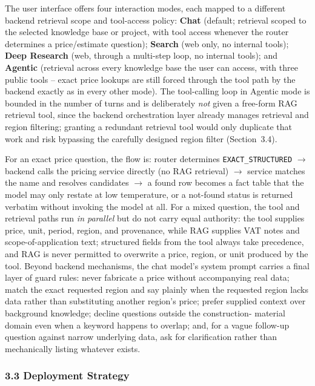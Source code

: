 \documentclass[11pt,a4paper]{article}
\begin{document}
The user interface offers four interaction modes, each mapped to a different
backend retrieval scope and tool-access policy: \textbf{Chat} (default;
retrieval scoped to the selected knowledge base or project, with tool access
whenever the router determines a price/estimate question); \textbf{Search}
(web only, no internal tools); \textbf{Deep Research} (web, through a
multi-step loop, no internal tools); and \textbf{Agentic} (retrieval across
every knowledge base the user can access, with three public tools -- exact
price lookups are still forced through the tool path by the backend exactly
as in every other mode). The tool-calling loop in Agentic mode is bounded in
the number of turns and is deliberately \emph{not} given a free-form RAG
retrieval tool, since the backend orchestration layer already manages
retrieval and region filtering; granting a redundant retrieval tool would
only duplicate that work and risk bypassing the carefully designed region
filter (Section~3.4).

For an exact price question, the flow is: router determines
\texttt{EXACT\_STRUCTURED} $\rightarrow$ backend calls the pricing service
directly (no RAG retrieval) $\rightarrow$ service matches the name and
resolves candidates $\rightarrow$ a found row becomes a fact table that the
model may only restate at low temperature, or a not-found status is
returned verbatim without invoking the model at all. For a mixed question,
the tool and retrieval paths run \emph{in parallel} but do not carry equal
authority: the tool supplies price, unit, period, region, and provenance,
while RAG supplies VAT notes and scope-of-application text; structured
fields from the tool always take precedence, and RAG is never permitted to
overwrite a price, region, or unit produced by the tool. Beyond backend
mechanisms, the chat model's system prompt carries a final layer of guard
rules: never fabricate a price without accompanying real data; match the
exact requested region and say plainly when the requested region lacks data
rather than substituting another region's price; prefer supplied context
over background knowledge; decline questions outside the construction-
material domain even when a keyword happens to overlap; and, for a vague
follow-up question against narrow underlying data, ask for clarification
rather than mechanically listing whatever exists.

\subsubsection{3.3 Deployment Strategy}
\end{document}
